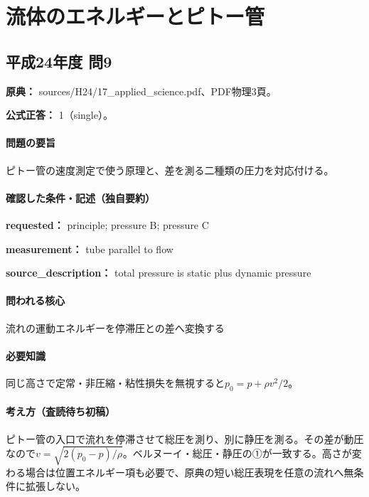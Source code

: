 \section{流体のエネルギーとピトー管}

\subsection{平成24年度 問9}
\label{q:h24-reg-applied-09}

\noindent\textbf{原典：} sources/H24/17\_applied\_science.pdf、PDF物理3頁。

\textbf{公式正答：} 1（single）。

\paragraph{問題の要旨} ピトー管の速度測定で使う原理と、差を測る二種類の圧力を対応付ける。

\paragraph{確認した条件・記述（独自要約）}\mbox{}\par

\noindent\textbf{requested：} principle; pressure B; pressure C\par

\noindent\textbf{measurement：} tube parallel to flow\par

\noindent\textbf{source\_description：} total pressure is static plus dynamic pressure\par

\paragraph{問われる核心} 流れの運動エネルギーを停滞圧との差へ変換する

\paragraph{必要知識} 同じ高さで定常・非圧縮・粘性損失を無視すると\(p_0=p+\rho v^2/2\)。

\paragraph{考え方（査読待ち初稿）} ピトー管の入口で流れを停滞させて総圧を測り、別に静圧を測る。その差が動圧なので\(v=\sqrt{2(p_0-p)/\rho}\)。ベルヌーイ・総圧・静圧の①が一致する。高さが変わる場合は位置エネルギー項も必要で、原典の短い総圧表現を任意の流れへ無条件に拡張しない。

